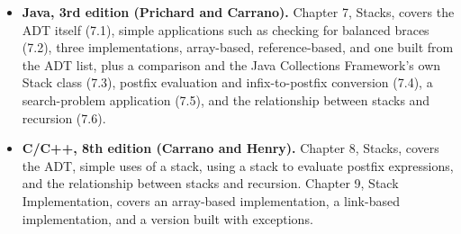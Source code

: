 \documentclass[11pt]{article}
\begin{document}
\begin{itemize}[leftmargin=1.4em]
  \item \textbf{Java, 3rd edition (Prichard and Carrano).} Chapter 7, Stacks, covers the
    ADT itself (7.1), simple applications such as checking for balanced braces (7.2), three
    implementations, array-based, reference-based, and one built from the ADT list, plus a
    comparison and the Java Collections Framework's own Stack class (7.3), postfix
    evaluation and infix-to-postfix conversion (7.4), a search-problem application (7.5),
    and the relationship between stacks and recursion (7.6).
  \item \textbf{C/C++, 8th edition (Carrano and Henry).} Chapter 8, Stacks, covers the ADT,
    simple uses of a stack, using a stack to evaluate postfix expressions, and the
    relationship between stacks and recursion. Chapter 9, Stack Implementation, covers an
    array-based implementation, a link-based implementation, and a version built with
    exceptions.
\end{itemize}
\end{document}
